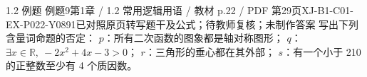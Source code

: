\par\noindent\begin{minipage}{\linewidth}
\begin{bankitem}{1.2 例题 例题9}{第1章 / 1.2 常用逻辑用语 / 教材 p.22 / PDF 第29页}{XJ-B1-C01-EX-P022-Y0891}{已对照原页转写题干及公式；待教师复核；未制作答案}
写出下列含量词命题的否定：
$p$：所有二次函数的图象都是轴对称图形；
$q$：$\exists x\in\mathbb R,\ -2x^2+4x-3>0$；
$r$：三角形的垂心都在其外部；
$s$：有一个小于 210 的正整数至少有 4 个质因数。
\end{bankitem}
\end{minipage}\par\medskip

